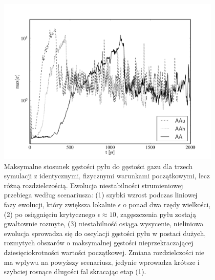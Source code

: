 \begin{figure}
   \includegraphics[width=0.98\linewidth]{figures/fig4}
   \caption{
      Maksymalne stosunek gęstości pyłu do gęstości gazu dla trzech symulacji z
      identycznymi, fizycznymi warunkami początkowymi, lecz różną
      rozdzielczością. Ewolucja niestabilności strumieniowej przebiega według
      scenariusza: (1) szybki wzrost podczas liniowej fazy ewolucji, który
      zwiększa lokalnie $\epsilon$ o ponad dwa rzędy wielkości, (2) po
      osiągnięciu krytycznego $\epsilon\approx 10$, zagęszczenia pyłu zostają
      gwałtownie rozmyte, (3) niestabilność osiąga wysycenie, nieliniowa
      ewolucja sprowadza się do oscylacji gęstości pyłu w postaci dużych,
      rozmytych obszarów o maksymalnej gęstości nieprzekraczającej
      dziesięciokrotności wartości początkowej. Zmiana rozdzielczości nie ma
      wpływu na powyższy scenariusz, jedynie wprowadza krótsze i szybciej
   rosnące długości fal skracając etap (1).}

   \label{fig4}
\end{figure}
%

